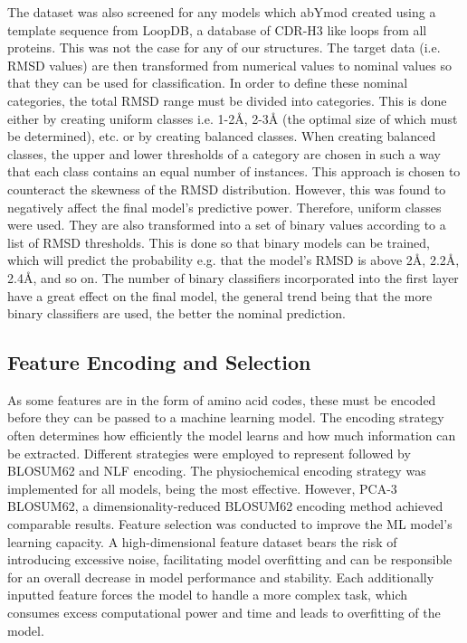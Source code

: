 \documentclass[preprint,12pt]{elsarticle}
\begin{document}
The dataset was also screened for any models which abYmod created using a template sequence from LoopDB, a database of CDR-H3 like loops from all proteins. This was not the case for any of our structures. 
The target data (i.e. RMSD values) are then transformed from numerical values to nominal values so that they can be used for classification. In order to define these nominal categories, the total RMSD range must be divided into categories. This is done either by creating uniform classes i.e. 1-2Å, 2-3Å (the optimal size of which must be determined), etc. or by creating balanced classes. When creating balanced classes, the upper and lower thresholds of a category are chosen in such a way that each class contains an equal number of instances. This approach is chosen to counteract the skewness of the RMSD distribution. However, this was found to negatively affect the final model’s predictive power. Therefore, uniform classes were used. 
They are also transformed into a set of binary values according to a list of RMSD thresholds. This is done so that binary models can be trained, which will predict the probability e.g. that the model’s RMSD is above 2Å, 2.2Å, 2.4Å, and so on. The number of binary classifiers incorporated into the first layer have a great effect on the final model, the general 
trend being that the more binary classifiers are used, the better the nominal prediction. 
\subsection{Feature Encoding and Selection}
\label{sec:sample2}

As some features are in the form of amino acid codes, these must be encoded before they can be passed to a machine learning model. The encoding strategy often determines how efficiently the model learns and how much information can be extracted. Different strategies were employed to represent followed by BLOSUM62 and NLF encoding. The physiochemical encoding strategy was implemented for all models, being the most effective. However, PCA-3 BLOSUM62, a dimensionality-reduced BLOSUM62 encoding method achieved comparable results. 
Feature selection was conducted to improve the ML model’s learning capacity. A high-dimensional feature dataset bears the risk of introducing excessive noise, facilitating model overfitting and can be responsible for an overall decrease in model performance and stability. Each additionally inputted feature forces the model to handle a more complex task, which consumes excess computational power and time and leads to overfitting of the model. 
\end{document}
